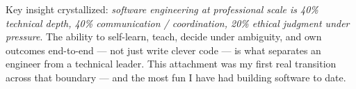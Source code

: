 Key insight crystallized: \textit{software engineering at professional scale is 40\% technical depth, 40\% communication / coordination, 20\% ethical judgment under pressure}. The ability to self-learn, teach, decide under ambiguity, and own outcomes end-to-end --- not just write clever code --- is what separates an engineer from a technical leader. This attachment was my first real transition across that boundary --- and the most fun I have had building software to date.

